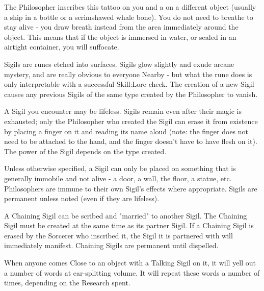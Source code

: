 {

The Philosopher inscribes this tattoo on you and a  on a different object (usually a ship in a bottle or a scrimshawed whale bone).  You do not need to breathe to stay alive - you draw breath instead from the area immediately around the object.  This means that if the object is immersed in water, or sealed in an airtight container, you will suffocate.


Sigils are runes etched into surfaces.  Sigils glow slightly and exude arcane mystery, and are really obvious to everyone Nearby - but what the rune does is only interpretable with a successful Skill:Lore check.  The creation of a new Sigil causes any previous Sigils of the same type created by the Philosopher to vanish.

A Sigil you encounter may be lifeless.  Sigils remain even after their magic is exhausted; only the Philosopher who created the Sigil can erase it from existence by placing a finger on it and reading its name aloud (note: the finger does not need to be attached to the hand, and the finger doesn't have to have flesh on it).  The power of the Sigil depends on the type created.

Unless otherwise specified, a Sigil can only be placed on something that is generally immobile and not alive - a door, a wall, the floor, a statue, etc.  Philosophers are immune to their own Sigil's effects where appropriate.  Sigils are permanent unless noted (even if they are lifeless).

\cbreak

\large{}\normalsize




A Chaining Sigil can be scribed and "married" to another Sigil.  The Chaining Sigil must be created at the same time as its partner Sigil.  If a Chaining Sigil is erased by the Sorcerer who inscribed it, the Sigil it is partnered with will immediately manifest.  Chaining Sigils are permanent until dispelled.


When anyone comes Close to an object with a Talking Sigil on it, it will yell out a number of words at ear-splitting volume.  It will repeat these words a number of times, depending on the Research spent.

}
